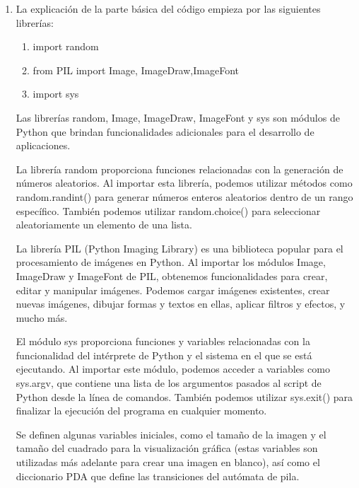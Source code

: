 \begin{enumerate}
\item La explicación de la parte básica del código empieza por las siguientes librerías:\newline
\begin{enumerate}
    \item import random\newline
    \item from PIL import Image, ImageDraw,ImageFont\newline
    \item import sys\newline
\end{enumerate}


Las librerías random, Image, ImageDraw, ImageFont y sys son módulos de Python que brindan funcionalidades adicionales para el desarrollo de aplicaciones.\newline

La librería random proporciona funciones relacionadas con la generación de números aleatorios. Al importar esta librería, podemos utilizar métodos como random.randint() para generar números enteros aleatorios dentro de un rango específico. También podemos utilizar random.choice() para seleccionar aleatoriamente un elemento de una lista.\newline

La librería PIL (Python Imaging Library) es una biblioteca popular para el procesamiento de imágenes en Python. Al importar los módulos Image, ImageDraw y ImageFont de PIL, obtenemos funcionalidades para crear, editar y manipular imágenes. Podemos cargar imágenes existentes, crear nuevas imágenes, dibujar formas y textos en ellas, aplicar filtros y efectos, y mucho más.\newline

El módulo sys proporciona funciones y variables relacionadas con la funcionalidad del intérprete de Python y el sistema en el que se está ejecutando. Al importar este módulo, podemos acceder a variables como sys.argv, que contiene una lista de los argumentos pasados al script de Python desde la línea de comandos. También podemos utilizar sys.exit() para finalizar la ejecución del programa en cualquier momento.\newline


Se definen algunas variables iniciales, como el tamaño de la imagen y el tamaño del cuadrado para la visualización gráfica (estas variables son utilizadas más adelante para crear una imagen en blanco), así como el diccionario PDA que define las transiciones del autómata de pila.\newline


\end{enumerate}
